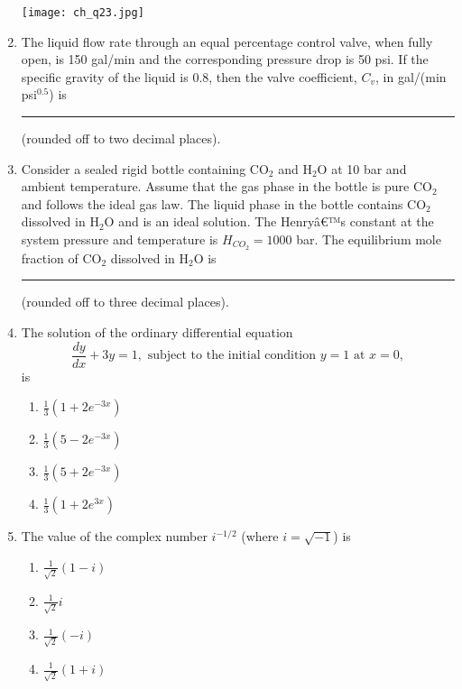 \documentclass[12pt]{article}
\begin{document}
\begin{enumerate}[label=Q.\arabic*]
			\begin{center}{
					\texttt{[image: ch\_q23.jpg]}
			}\end{center}

		\item The liquid flow rate through an equal percentage control valve, when fully open, is 150 gal/min and the corresponding pressure drop is 50 psi. If the specific gravity of the liquid is 0.8, then the valve coefficient, $C_v$, in gal/(min psi$^{0.5}$) is \rule{3cm}{0.15mm} (rounded off to two decimal places).

		\item Consider a sealed rigid bottle containing CO$_2$ and H$_2$O at 10 bar and ambient temperature. Assume that the gas phase in the bottle is pure CO$_2$ and follows the ideal gas law. The liquid phase in the bottle contains CO$_2$ dissolved in H$_2$O and is an ideal solution. The Henryâ€™s constant at the system pressure and temperature is $H_{CO_2} = 1000$ bar. The equilibrium mole fraction of CO$_2$ dissolved in H$_2$O is \rule{3cm}{0.15mm} (rounded off to three decimal places).

		\item The solution of the ordinary differential equation
			\[ \frac{dy}{dx} + 3y = 1, \text{ subject to the initial condition } y = 1 \text{ at } x = 0, \]
			is
			\begin{multicols}{2}
				\begin{enumerate}[label=(\Alph*)]
					\item $\frac{1}{3}(1 + 2e^{-3x})$
					\item $\frac{1}{3}(5 - 2e^{-3x})$
					\item $\frac{1}{3}(5 + 2e^{-3x})$
					\item $\frac{1}{3}(1 + 2e^{3x})$
				\end{enumerate}
			\end{multicols}

		\item The value of the complex number $i^{-1/2}$ (where $i = \sqrt{-1}$) is
			\begin{multicols}{2}
				\begin{enumerate}[label=(\Alph*)]
					\item $\frac{1}{\sqrt{2}}(1 - i)$
					\item $\frac{1}{\sqrt{2}}i$
					\item $\frac{1}{\sqrt{2}}(-i)$
					\item $\frac{1}{\sqrt{2}}(1 + i)$
				\end{enumerate}
			\end{multicols}


\end{enumerate}
\end{document}
